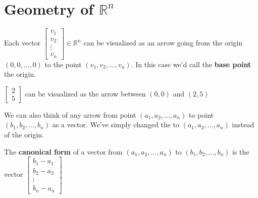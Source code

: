 \section{Geometry of $\mathbb{R}^n$}

Each vector $\begin{bmatrix}v_1\\v_2 \\ \vdots \\ v_n \end{bmatrix} \in \mathbb{R}^n$ can be visualized as an arrow going from the origin 
$(0,0, \ldots, 0)$ to the point $(v_1, v_2, \ldots, v_n)$.  In this case we'd call the \textbf{base point} the origin.

\begin{example}
$\begin{bmatrix}2\\5\end{bmatrix}$ can be visualized as the arrow between $(0,0)$ and $(2,5)$\\
\begin{center}
\end{center}
\end{example}

We can also think of any arrow from point $(a_1, a_2, \ldots, a_n)$ to point $(b_1, b_2, \ldots, b_n)$ as a vector. We've simply changed 
the  to $(a_1, a_2, \ldots, a_n)$ instead of the origin. 

\begin{definition}
The \textbf{canonical form} of a vector from $(a_1, a_2, \ldots, a_n)$ to $(b_1, b_2, \ldots, b_n)$ is the vector 
$\begin{bmatrix}b_1-a_1 \\ b_2-a_2 \\ \vdots \\ b_n-a_n\end{bmatrix}$
\end{definition}


